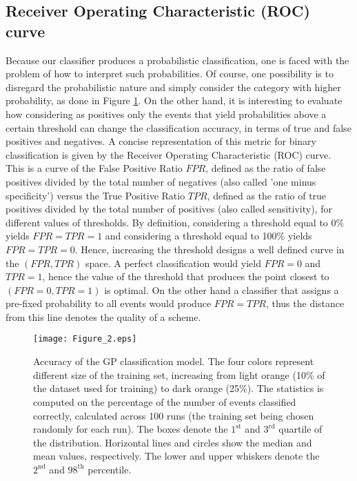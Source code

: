 \documentclass[draft,jgrga]{agutex}
\begin{document}
\begin{article}
\subsection{Receiver Operating Characteristic (ROC) curve}
Because our classifier produces a probabilistic classification, one is faced with the problem of how to interpret such probabilities. Of course, one possibility is to disregard the probabilistic nature and simply consider the category with higher probability, as done in Figure \ref{fig:histogram}. On the other hand, it is interesting to evaluate how considering as positives only the events that yield probabilities above a certain threshold can change the classification accuracy, in terms of true and false positives and negatives. 
A concise representation of this metric for binary classification is given by the Receiver Operating Characteristic (ROC) curve. This is a curve of the False Positive Ratio $FPR$, defined as the ratio of false positives divided by the total number of negatives (also called 'one minus specificity') versus the True Positive Ratio $TPR$, defined as the ratio of true positives divided by the total number of positives (also called sensitivity), for different values of thresholds.  By definition,  considering a threshold equal to $0\%$ yields $FPR=TPR=1$ and considering a threshold equal to 100\% yields $FPR=TPR=0$. Hence, increasing the threshold designs a well defined curve in the $(FPR,TPR)$ space. A perfect classification would yield $FPR=0$ and $TPR=1$, hence the value of the threshold that produces the point closest to $(FPR=0,TPR=1)$ is optimal. On the other hand a classifier that assigns a pre-fixed probability to all events would produce $FPR=TPR$, thus the distance from this line denotes the quality of a scheme.

\begin{figure}[ht!]
 \centering
 \texttt{[image: Figure\_2.eps]}
\caption{Accuracy of the GP classification model. The four colors represent different size of the training set, increasing from light orange (10\% of the dataset used for training) to dark orange (25\%).
The statistics is computed on the percentage of the number of events classified correctly, calculated across 100 runs (the training set being chosen randomly for each run). The boxes denote the $1^\textrm{st}$ and $3^\textrm{rd}$ quartile of the distribution. Horizontal lines and circles show the median and mean values, respectively. The lower and upper whiskers denote the $2^\textrm{nd}$ and $98^\textrm{th}$ percentile.}
\label{fig:histogram}
\end{figure}


\end{article}
\end{document}
